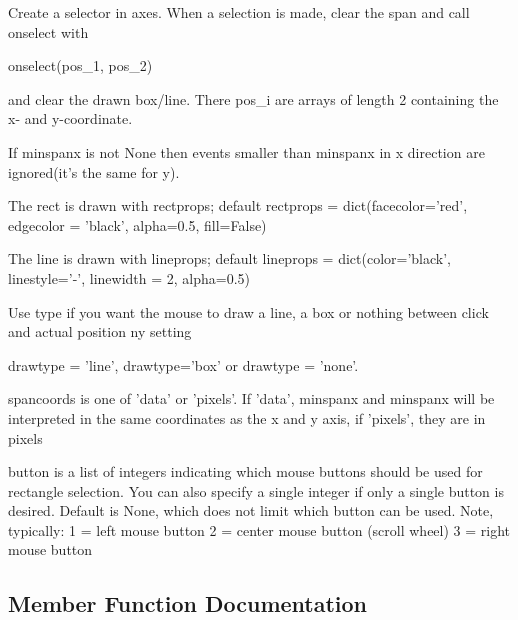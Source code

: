 \begin{DoxyVerb}Create a selector in axes.  When a selection is made, clear
the span and call onselect with

  onselect(pos_1, pos_2)

and clear the drawn box/line. There pos_i are arrays of length 2
containing the x- and y-coordinate.

If minspanx is not None then events smaller than minspanx
in x direction are ignored(it's the same for y).

The rect is drawn with rectprops; default
  rectprops = dict(facecolor='red', edgecolor = 'black',
           alpha=0.5, fill=False)

The line is drawn with lineprops; default
  lineprops = dict(color='black', linestyle='-',
           linewidth = 2, alpha=0.5)

Use type if you want the mouse to draw a line, a box or nothing
between click and actual position ny setting

drawtype = 'line', drawtype='box' or drawtype = 'none'.

spancoords is one of 'data' or 'pixels'.  If 'data', minspanx
and minspanx will be interpreted in the same coordinates as
the x and y axis, if 'pixels', they are in pixels

button is a list of integers indicating which mouse buttons should
be used for rectangle selection.  You can also specify a single
integer if only a single button is desired.  Default is None, which
does not limit which button can be used.
Note, typically:
 1 = left mouse button
 2 = center mouse button (scroll wheel)
 3 = right mouse button
\end{DoxyVerb}
 

\subsection{Member Function Documentation}
\hypertarget{class_uni_dec_1_1unidec__modules_1_1isolated__packages_1_1_zoom_box_1_1_zoom_box_ad4dd4e92d7c50ecedb38089e645a3245}{}
